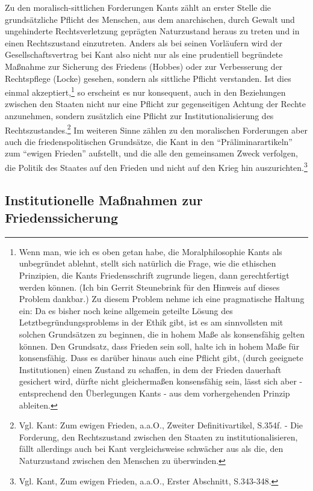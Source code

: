 \documentclass[12pt,a4paper,ngerman]{article}
\begin{document}
Zu den moralisch-sittlichen Forderungen Kants zählt an erster Stelle
die grundsätzliche Pflicht des Menschen, aus dem anarchischen, durch
Gewalt und ungehinderte Rechtsverletzung geprägten Naturzustand
heraus zu treten und in einen Rechtszustand einzutreten. Anders als bei
seinen Vorläufern wird der Gesellschaftsvertrag bei Kant also nicht
nur als eine prudentiell begründete Maßnahme zur Sicherung des
Friedens (Hobbes) oder zur Verbesserung der Rechtspflege (Locke)
gesehen, sondern als sittliche Pflicht verstanden. Ist dies einmal
akzeptiert,\footnote{Wenn man, wie ich es oben getan habe, die
  Moralphilosophie Kants als unbegründet ablehnt, stellt sich
  natürlich die Frage, wie die ethischen Prinzipien, die Kants
  Friedensschrift zugrunde liegen, dann gerechtfertigt werden können.
  (Ich bin Gerrit Steunebrink für den Hinweis auf dieses Problem
  dankbar.) Zu diesem Problem nehme ich eine pragmatische Haltung ein:
  Da es bisher noch keine allgemein geteilte Lösung des
  Letztbegründungsproblems in der Ethik gibt, ist es am sinnvollsten
  mit solchen Grundsätzen zu beginnen, die in hohem Maße als
  konsensfähig gelten können. Den Grundsatz, dass Frieden sein soll,
  halte ich in hohem Maße für konsensfähig. Dass es darüber hinaus
  auch eine Pflicht gibt, (durch geeignete Institutionen) einen
  Zustand zu schaffen, in dem der Frieden dauerhaft gesichert wird,
  dürfte nicht gleichermaßen konsensfähig sein, lässt sich aber -
  entsprechend den Überlegungen Kants - aus dem vorhergehenden Prinzip
  ableiten.} so erscheint es nur konsequent, auch in den Beziehungen
zwischen den Staaten nicht nur eine Pflicht zur gegenseitigen Achtung
der Rechte anzunehmen, sondern zusätzlich eine Pflicht zur
Institutionalisierung des Rechtszustandes.\footnote{Vgl.  Kant: Zum
  ewigen Frieden, a.a.O., Zweiter Definitivartikel, S.354f.  - Die
  Forderung, den Rechtszustand zwischen den Staaten zu
  institutionalisieren, fällt allerdings auch bei Kant vergleichsweise
  schwächer aus als die, den Naturzustand zwischen den Menschen zu
  überwinden.} Im weiteren Sinne zählen zu den moralischen Forderungen
aber auch die friedenspolitischen Grundsätze, die Kant in den
"`Präliminarartikeln"' zum "`ewigen Frieden"' aufstellt, und die alle
den gemeinsamen Zweck verfolgen, die Politik des Staates auf den
Frieden und nicht auf den Krieg hin auszurichten.\footnote{Vgl. Kant, Zum
  ewigen Frieden, a.a.O., Erster Abschnitt, S.343-348.}

\subsection{Institutionelle Maßnahmen zur Friedenssicherung}
\end{document}
